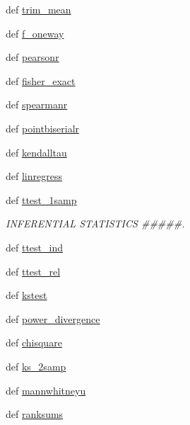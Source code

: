 \begin{DoxyCompactItemize}
def \hyperlink{namespacescipy_1_1stats_1_1stats_a89437599855e82f8fb127a272820db0e}{trim\+\_\+mean}
\item 
def \hyperlink{namespacescipy_1_1stats_1_1stats_a9346383e181e93b1660d793d6081bd1a}{f\+\_\+oneway}
\item 
def \hyperlink{namespacescipy_1_1stats_1_1stats_a807da91092280c6c409ba4dd7aecf0ae}{pearsonr}
\item 
def \hyperlink{namespacescipy_1_1stats_1_1stats_aff7e685424bb5315cb65e12ddb5260f4}{fisher\+\_\+exact}
\item 
def \hyperlink{namespacescipy_1_1stats_1_1stats_a33d608de2cbc6328c57ba67d3ad0a253}{spearmanr}
\item 
def \hyperlink{namespacescipy_1_1stats_1_1stats_ab33df19284919454cbde0baf361d2287}{pointbiserialr}
\item 
def \hyperlink{namespacescipy_1_1stats_1_1stats_a484892cdf73483268a7f152eef1ae783}{kendalltau}
\item 
def \hyperlink{namespacescipy_1_1stats_1_1stats_a1dc45b95d34e45687312f7cf93b8f7ee}{linregress}
\item 
def \hyperlink{namespacescipy_1_1stats_1_1stats_aaec760400f4bdc5e967fe375757db5ad}{ttest\+\_\+1samp}
\begin{DoxyCompactList}\small\item\em I\+N\+F\+E\+R\+E\+N\+T\+I\+A\+L S\+T\+A\+T\+I\+S\+T\+I\+C\+S \#\#\#\#\#. \end{DoxyCompactList}\item 
def \hyperlink{namespacescipy_1_1stats_1_1stats_a84703cd17b880e6be5071f665c0ebcc0}{ttest\+\_\+ind}
\item 
def \hyperlink{namespacescipy_1_1stats_1_1stats_aed469b7890b916252322b8536991f72f}{ttest\+\_\+rel}
\item 
def \hyperlink{namespacescipy_1_1stats_1_1stats_a20ee3cba8d73095d2c9b1f2810facbfd}{kstest}
\item 
def \hyperlink{namespacescipy_1_1stats_1_1stats_a14512b7b896743b932c0b31425740432}{power\+\_\+divergence}
\item 
def \hyperlink{namespacescipy_1_1stats_1_1stats_a53fbdf360f83246922ca24554f8baefa}{chisquare}
\item 
def \hyperlink{namespacescipy_1_1stats_1_1stats_a43a4544480a8139b6c0ee7421210e53c}{ks\+\_\+2samp}
\item 
def \hyperlink{namespacescipy_1_1stats_1_1stats_ab1d6bbc85f44f5ff1083f04839e5291e}{mannwhitneyu}
\item 
def \hyperlink{namespacescipy_1_1stats_1_1stats_a43186935210b50e761236cad7f4197ea}{ranksums}

\end{DoxyCompactItemize}
